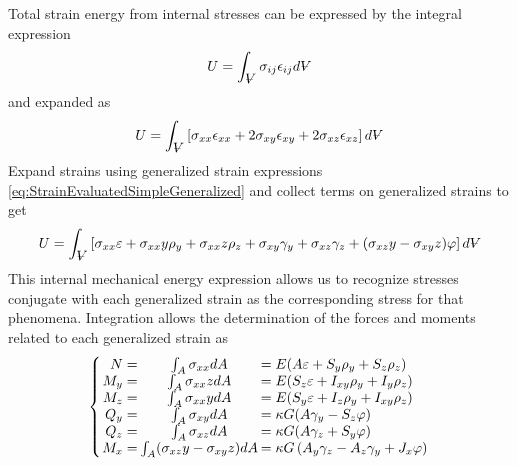 Total strain energy from internal stresses can be expressed by the integral expression
\begin{equation}\label{eq:TotalVirtualStrainEnergyExpression}
U = \int_{\volume}\sigma_{ij}\epsilon_{ij}d\volume
\end{equation}
and expanded as
\begin{equation}\label{eq:TotalStrainEnergyExpanded}
U=\int_{\volume}\left[\sigma_{xx}\epsilon_{xx}+2\sigma_{xy}\epsilon_{xy}+2\sigma_{xz}\epsilon_{xz}\right]d\volume
\end{equation}
Expand strains using generalized strain expressions \eqref{eq:StrainEvaluatedSimpleGeneralized} and collect terms on generalized strains to get
\begin{equation}\label{eq:TotalStrainEnergyGeneralized}
 U=\int_{\volume}\left[\sigma_{xx}\varepsilon+\sigma_{xx}y\rho_y+\sigma_{xx}z\rho_z+\sigma_{xy}\gamma_y+\sigma_{xz}\gamma_z+(\sigma_{xz}y-\sigma_{xy}z)\varphi\right]d\volume
\end{equation}
This internal mechanical energy expression allows us to recognize stresses conjugate with each generalized strain as the corresponding stress for that phenomena. Integration allows the determination of the forces and moments related to each generalized strain as
\begin{equation}\label{eq:generalizedForces}
\left\{\arraycolsep=1pt\begin{array}{rcl}
N=&\int_A\sigma_{xx}dA&=E( A\varepsilon+S_y\rho_y+S_z\rho_z)\\
M_y=&\int_A\sigma_{xx}zdA&=E(S_z\varepsilon+I_{xy}\rho_y+I_y\rho_z)\\
M_z=&\int_A\sigma_{xx}ydA&=E(S_y\varepsilon+I_z\rho_y+I_{xy}\rho_z)\\
Q_y=&\int_A\sigma_{xy}dA&=\kappa G(A\gamma_y-S_z\varphi)\\
Q_z=&\int_A\sigma_{xz}dA&=\kappa G(A\gamma_z+S_y\varphi)\\
M_x=&\int_A(\sigma_{xz}y-\sigma_{xy}z)dA&=\kappa G\left(A_y\gamma_z-A_z\gamma_y+J_x\varphi\right)
\end{array}\right.
\end{equation}
